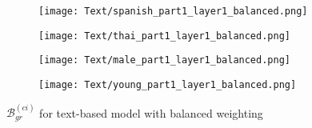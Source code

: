 \begin{figure}[H]
    \centering
    \begin{minipage}{0.23\textwidth}
        \begin{figure}[H]
            \centering
            \texttt{[image: Text/spanish\_part1\_layer1\_balanced.png]}
        \end{figure}
    \end{minipage}
    \begin{minipage}{0.23\textwidth}
        \begin{figure}[H]
            \centering
            \texttt{[image: Text/thai\_part1\_layer1\_balanced.png]}
        \end{figure}
    \end{minipage}
    \begin{minipage}{0.23\textwidth}
        \begin{figure}[H]
            \centering
            \texttt{[image: Text/male\_part1\_layer1\_balanced.png]}
        \end{figure}
    \end{minipage}
    \begin{minipage}{0.23\textwidth}
        \begin{figure}[H]
            \centering
            \texttt{[image: Text/young\_part1\_layer1\_balanced.png]}
        \end{figure}
    \end{minipage}
    \caption{$\mathcal{B}_{gr}^{(ci)}$ for text-based model with balanced weighting}
    \label{fig:grad_text_balanced}
\end{figure}


